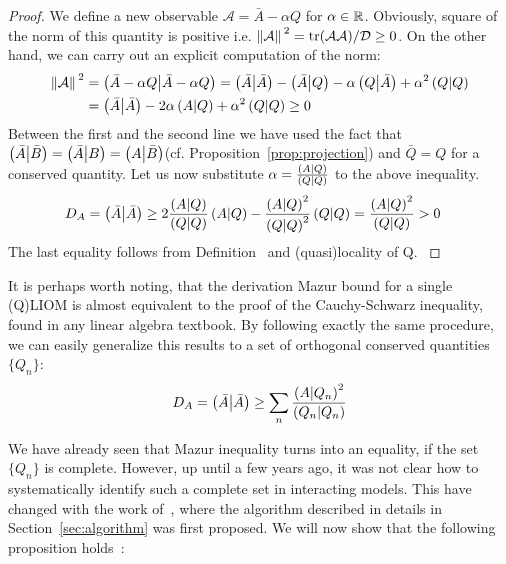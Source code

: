 \begin{proof}
  We define a new observable \(\mathcal{A} = \bar{A} - \alpha Q\) for \(\alpha \in \mathbb{R}\).
  Obviously, square of the norm of this quantity is positive i.e. \(\norm*{\mathcal{A}}^2 = 
  \tr(\mathcal{A}\mathcal{A})/\mathcal{D} \geq 0\). On the other hand, we can carry out an
  explicit computation of the norm:
  \begin{align*}
  \norm*{\mathcal{A}}^2 &= \left(\bar{A}-\alpha Q \middle| \bar{A}-\alpha Q\right) = \left(\bar{A} \middle| \bar{A}\right) - 
  \left(\bar{A} \middle| Q\right) - \alpha \left(Q \middle| \bar{A}\right) + \alpha^2 \left(Q \middle| Q\right) \\
  &= \left(\bar{A} \middle| \bar{A}\right) - 2\alpha \left(A \middle| Q\right) + \alpha^2 \left(Q \middle| Q\right) \geq 0
  \end{align*}
  Between the first and the second line we have used the fact that \(\left(\bar{A} \middle| \bar{B}\right) = 
  \left(\bar{A} \middle| B\right) = \left(A \middle| \bar{B}\right)\)(cf. Proposition~\ref{prop:projection}) and \(\bar{Q} = Q\) 
  for a conserved quantity. Let us now substitute \(\alpha = \frac{\left(A \middle| Q\right)}{\left(Q \middle| Q\right)}\) to the
  above inequality.
  \begin{align*}
    D_A = \left(\bar{A} \middle| \bar{A}\right) &\geq 2 \frac{\left(A \middle| Q\right)}{\left(Q \middle| Q\right)} \left(A \middle| Q\right) - \frac{\left(A \middle| Q\right)^2}{\left(Q \middle| Q\right)^2}\left(Q \middle| Q\right)
    = \frac{\left(A \middle| Q\right)^2}{\left(Q \middle| Q\right)} > 0
  \end{align*}
  The last equality follows from Definition~ and (quasi)locality of Q.
  \label{proof:single mazur}  
\end{proof}
It is perhaps worth noting, that the derivation Mazur bound for a single (Q)LIOM is almost equivalent to the proof of
the Cauchy-Schwarz inequality, found in any linear algebra textbook. By following exactly the same procedure, 
we can easily generalize this results to a set of orthogonal conserved quantities \(\{Q_{n}\}\):
\begin{equation}
  D_A = \left(\bar{A} \middle| \bar{A}\right) \geq \sum_{n} \frac{\left(A \middle| Q_n\right)^2}{\left(Q_n \middle| Q_n\right)}
\end{equation}

We have already seen that Mazur inequality turns into an equality, if the set \(\{Q_n\}\) is complete. However,
up until a few years ago, it was not clear how to systematically identify such a complete set in interacting models.
This have changed with the work of~\textcite{Mierzejewski2015a}, where the algorithm described in details
in Section~\ref{sec:algorithm} was first proposed. We will now show that the following proposition holds~\autocite{Mierzejewski2015Approx}:

